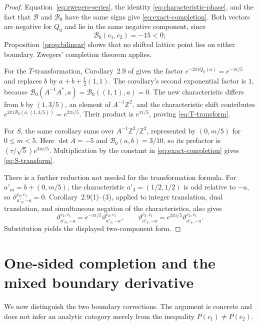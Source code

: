 \documentclass[12pt]{amsart}
\theoremstyle{definition}
\theoremstyle{remark}
\newcommand{\ZZ}{\mathbb{Z}}
\begin{document}
\begin{proof}
Equation~\eqref{eq:zwegers-series}, the identity
\eqref{eq:characteristic-phase}, and the fact that
$\mathcal B$ and $\mathcal B_0$ have the same signs give
\eqref{eq:exact-completion}.  Both vectors are negative for $Q_0$
and lie in the same negative component,
since
\[
  \mathcal B_0(c_1,c_2)=-15<0;
\]
Proposition~\ref{prop:bilinear} shows that no shifted lattice point lies
on either boundary.  Zwegers' completion theorem applies.

For the $T$-transformation, Corollary~2.9 of \cite{oZw02} gives the
factor $e^{-2\pi iQ_0(a)}=e^{-\pi i/5}$ and replaces $b$ by
$a+b+\tfrac12(1,1)$.  The corollary's second exponential factor is
$1$, because
$\mathcal B_0(A^{-1}A^{\ast},a)=\mathcal B_0((1,1),a)=0$.
The new characteristic differs from $b$ by $(1,3/5)$, an element of
$A^{-1}\ZZ^2$, and the characteristic shift contributes
$e^{2\pi i\mathcal B_0(a,(1,3/5))}=e^{2\pi i/5}$.  Their product is
$e^{\pi i/5}$, proving \eqref{eq:T-transform}.

For $S$, the same corollary sums over
$A^{-1}\ZZ^2/\ZZ^2$, represented by $(0,m/5)$ for $0\leq m<5$.
Here $\det A=-5$ and
$\mathcal B_0(a,b)=3/10$, so its prefactor is
$(\tau/\sqrt5)e^{3\pi i/5}$.  Multiplication by the constant in
\eqref{eq:exact-completion} gives \eqref{eq:S-transform}.

There is a further reduction not needed for the transformation formula.
For $a'_m=b+(0,m/5)$, the characteristic $a'_3=(1/2,1/2)$ is odd
relative to $-a$, so
$\vartheta_{a'_3,-a}^{c_2,c_1}=0$.  Corollary~2.9(1)--(3), applied to
integer translation, dual translation, and simultaneous negation of
the characteristics, also gives
\[
  \vartheta_{a'_0,-a}^{c_2,c_1}
    =e^{-\pi i/5}\vartheta_{a'_1,-a}^{c_2,c_1},
  \qquad
  \vartheta_{a'_2,-a}^{c_2,c_1}
    =e^{3\pi i/5}\vartheta_{a'_4,-a}^{c_2,c_1}.
\]
Substitution yields the displayed two-component form.
\end{proof}

\section{One-sided completion and the mixed boundary derivative}
\label{sec:shadow}

We now distinguish the two boundary corrections.  The argument is
concrete and does not infer an analytic category merely from the inequality
$P(c_1)\neq P(c_2)$.
\end{document}
